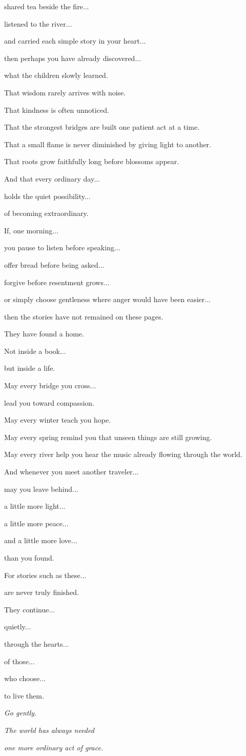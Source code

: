 \documentclass[12pt,openany]{book}
\begin{document}
shared tea beside the fire...

listened to the river...

and carried each simple story in your heart...

then perhaps you have already discovered...

what the children slowly learned.

That wisdom rarely arrives with noise.

That kindness is often unnoticed.

That the strongest bridges are built one patient act at a time.

That a small flame is never diminished by giving light to another.

That roots grow faithfully long before blossoms appear.

And that every ordinary day...

holds the quiet possibility...

of becoming extraordinary.

If, one morning...

you pause to listen before speaking...

offer bread before being asked...

forgive before resentment grows...

or simply choose gentleness where anger would have been easier...

then the stories have not remained on these pages.

They have found a home.

Not inside a book...

but inside a life.

May every bridge you cross...

lead you toward compassion.

May every winter teach you hope.

May every spring remind you that unseen things are still growing.

May every river help you hear the music already flowing through the world.

And whenever you meet another traveler...

may you leave behind...

a little more light...

a little more peace...

and a little more love...

than you found.

For stories such as these...

are never truly finished.

They continue...

quietly...

through the hearts...

of those...

who choose...

to live them.

\begin{center}

\Large\textit{Go gently.}

\vspace{0.5cm}

\Large\textit{The world has always needed}

\Large\textit{one more ordinary act of grace.}

\end{center}
\end{document}

